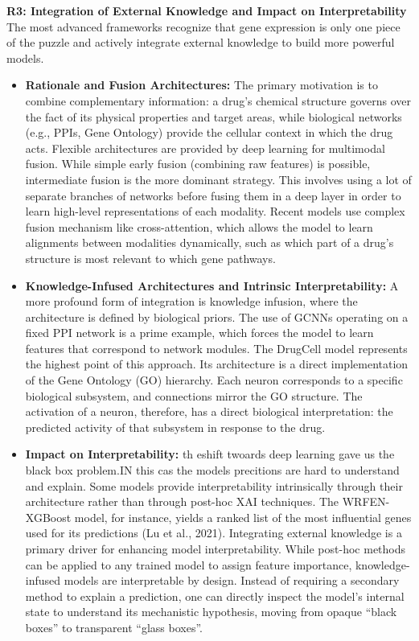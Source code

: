 \documentclass[twocolumn,12pt,a4paper]{article}
\begin{document}
\textbf{R3: Integration of External Knowledge and Impact on Interpretability}
The most advanced frameworks recognize that gene expression is only one piece of the puzzle and actively integrate external knowledge to build more powerful models.
\\
\begin{itemize}
    \item \textbf{Rationale and Fusion Architectures:} The primary motivation is to combine complementary information: a drug's chemical structure governs over the fact of its physical properties and target areas, while biological networks (e.g., PPIs, Gene Ontology) provide the cellular context in which the drug acts\cite{liu2015compound}. Flexible architectures are provided by deep learning for multimodal fusion. While simple early fusion (combining raw features) is possible, intermediate fusion is the more dominant strategy. This involves using a lot of separate branches of networks before fusing them in a deep layer in order to learn high-level representations of each modality\cite{stahlschmidt2022multimodal}. Recent models use complex fusion mechanism like cross-attention, which allows the model to learn alignments between modalities dynamically, such as which part of a drug's structure is most relevant to which gene pathways\cite{elabd2024simple}.
    \item \textbf{Knowledge-Infused Architectures and Intrinsic Interpretability:} A more profound form of integration is knowledge infusion, where the architecture is defined by biological priors. The use of GCNNs operating on a fixed PPI network is a prime example, which forces the model to learn features that correspond to network modules\cite{mcdermott2019deep}. The DrugCell model represents the highest point of this approach\cite{elabd2024simple}.  Its architecture is a direct implementation of the Gene Ontology (GO) hierarchy.  Each neuron corresponds to a specific biological subsystem, and connections mirror the GO structure. The activation of a neuron, therefore, has a direct biological interpretation: the predicted activity of that subsystem in response to the drug\cite{samal2022opportunities}.
    \item \textbf{Impact on Interpretability:} th eshift twoards deep learning gave us the black box problem.IN this cas the models precitions are hard to understand and explain. Some models provide interpretability intrinsically through their architecture rather than through post-hoc XAI techniques. The WRFEN-XGBoost model, for instance, yields a ranked list of the most influential genes used for its predictions (Lu et al., 2021)\cite{lu2021drug}. Integrating external knowledge is a primary driver for enhancing model interpretability. While post-hoc methods can be applied to any trained model to assign feature importance, knowledge-infused models are interpretable by design\cite{samal2022opportunities}. Instead of requiring a secondary method to explain a prediction, one can directly inspect the model's internal state to understand its mechanistic hypothesis, moving from opaque  \enquote{black boxes} to transparent \enquote{glass boxes}.
\end{itemize}
\end{document}

